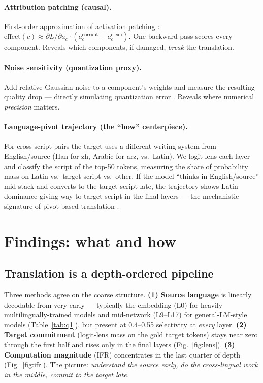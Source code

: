 \documentclass[11pt]{article}
\begin{document}
\paragraph{Attribution patching (causal).} First-order approximation of
activation patching \citep{kramar2024atp}: $\text{effect}(c)\approx \partial L/\partial a_c \cdot
(a_c^{\text{corrupt}}-a_c^{\text{clean}})$. One backward pass scores every
component. Reveals which components, if damaged, \emph{break} the translation.

\paragraph{Noise sensitivity (quantization proxy).} Add relative Gaussian
noise to a component's weights and measure the resulting quality drop ---
directly simulating quantization error \citep{frantar2023gptq,lin2024awq}.
Reveals where numerical \emph{precision} matters.

\paragraph{Language-pivot trajectory (the ``how'' centerpiece).} For
cross-script pairs the target uses a different writing system from
English/source (Han for zh, Arabic for arz, vs.\ Latin). We logit-lens each
layer and classify the script of the top-50 tokens, measuring the share of
probability mass on Latin vs.\ target script vs.\ other. If the model
``thinks in English/source'' mid-stack and converts to the target script
late, the trajectory shows Latin dominance giving way to target script in the
final layers --- the mechanistic signature of pivot-based translation
\citep[cf.][]{wendler2024llamas,dumas2024tongue}.

\section{Findings: what and how}

\subsection{Translation is a depth-ordered pipeline}

Three methods agree on the coarse structure. \textbf{(1) Source language} is
linearly decodable from very early --- typically the embedding (L0) for
heavily multilingually-trained models and mid-network (L9--L17) for
general-LM-style models (Table~\ref{tab:q1}), but present at 0.4--0.55
selectivity at \emph{every} layer. \textbf{(2) Target commitment} (logit-lens
mass on the gold target tokens) stays near zero through the first half and
rises only in the final layers (Fig.~\ref{fig:lens}). \textbf{(3) Computation
magnitude} (IFR) concentrates in the last quarter of depth
(Fig.~\ref{fig:ifr}). The picture: \emph{understand the source early, do the
cross-lingual work in the middle, commit to the target late.}
\end{document}
